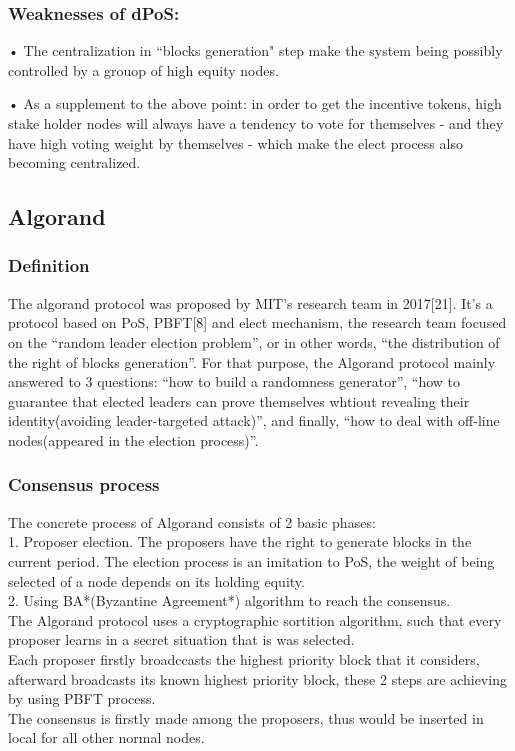 \documentclass[doublespacing]{bmcart}
\begin{document}
\begin{CJK*}{UTF8}{gbsn}
\subsubsection*{Weaknesses of dPoS:}	
• The centralization in ``blocks generation" step make the system being possibly controlled by a grouop of high equity nodes.
\par • As a supplement to the above point: in order to get the incentive tokens, high stake holder nodes will always have a tendency to vote for themselves - and they have high voting weight by themselves - which make the elect process also becoming centralized.
	
	\subsection{Algorand}
	\subsubsection*{Definition}  
	The algorand protocol was proposed by MIT's research team in 2017[21]. It's a protocol based on PoS, PBFT[8] and elect mechanism, the research team focused on the ``random leader election problem'', or in other words, ``the distribution of the right of blocks generation''. For that purpose, the Algorand protocol mainly answered to 3 questions: ``how to build a randomness generator'', ``how to guarantee that elected leaders can prove themselves whtiout revealing their identity(avoiding leader-targeted attack)'', and finally, ``how to deal with off-line nodes(appeared in the election process)''.
	\subsubsection*{Consensus process}
	The concrete process of Algorand consists of 2 basic phases: 
	\\1. Proposer election. The proposers have the right to generate blocks in the current period. The election process is an imitation to PoS, the weight of being selected of a node depends on its holding equity.
	\\2. Using BA*(Byzantine Agreement*) algorithm to reach the consensus.
	\\The Algorand protocol uses a  cryptographic sortition algorithm, such that every proposer learns in a secret situation that is was selected.	
	\\Each proposer firstly broadccasts the highest priority block that it considers, afterward broadcasts its known highest priority block, these 2 steps are achieving by using PBFT process.
	\\The consensus is firstly made among the proposers, thus would be inserted in local for all other normal nodes. 

\end{CJK*}
\end{document}
